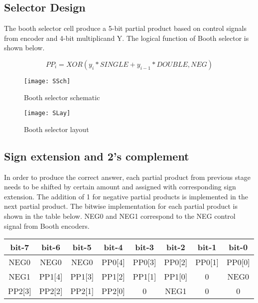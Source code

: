 \documentclass[conference]{IEEEtran}
\begin{document}
\subsection{Selector Design}

The booth selector cell produce a 5-bit partial product based on control signals from encoder and 4-bit multiplicand Y.  The logical function of Booth selector is shown below.

\[PP_i = XOR(y_i*SINGLE+y_{i-1}*DOUBLE, NEG)\]

\begin{figure}[!htb]
\centering
\texttt{[image: SSch]}
\caption{Booth selector schematic}
\label{fig_sim}
\end{figure}

\begin{figure}[!htb]
\centering
\texttt{[image: SLay]}
\caption{Booth selector layout}
\label{fig_sim}
\end{figure}


\subsection{Sign extension and 2’s complement}
In order to produce the correct answer, each partial product from previous stage needs to be shifted by certain amount and assigned with corresponding sign extension. The addition of 1 for negative partial products is implemented in the next partial product. The bitwise implementation for each partial product is shown in the table below. NEG0 and NEG1 correspond to the NEG control signal from Booth encoders.

\begin{table}[!htb]
\renewcommand{\arraystretch}{1.3}
\centering
\begin{tabular}{|c|c|c|c|c|c|c|c|}
\hline
bit-7 & bit-6 & bit-5 & bit-4 & bit-3 & bit-2 & bit-1 & bit-0 \\
\hline
NEG0 & NEG0 & NEG0 & PP0[4] & PP0[3] & PP0[2] & PP0[1] & PP0[0] \\
\hline
NEG1 & PP1[4] & PP1[3] & PP1[2] & PP1[1] & PP1[0] & 0 & NEG0 \\
\hline
PP2[3] & PP2[2] & PP2[1] & PP2[0] & 0 & NEG1 & 0 & 0 \\
\hline
\end{tabular}
\end{table}
\end{document}
